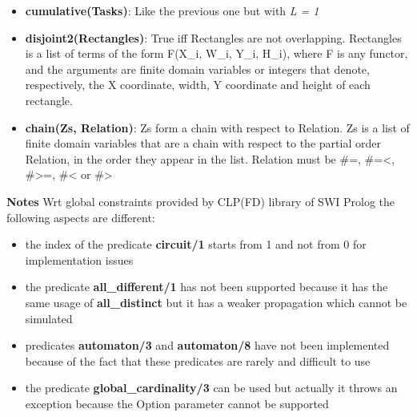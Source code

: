 \begin{itemize}
    \item \textbf{cumulative(Tasks)}: Like the previous one but with \textit{L = 1}
    \item \textbf{disjoint2(Rectangles)}: True iff Rectangles are not overlapping. Rectangles is a list of terms of the form F(X\_i, W\_i, Y\_i, H\_i), where F is any functor, and the arguments are finite domain variables or integers that denote, respectively, the X coordinate, width, Y coordinate and height of each rectangle.
    \item \textbf{chain(Zs, Relation)}: Zs form a chain with respect to Relation. Zs is a list of finite domain variables that are a chain with respect to the partial order Relation, in the order they appear in the list. Relation must be \#=, \#=<, \#>=, \#< or \#>
\end{itemize}
\textbf{Notes}\newline\newline
Wrt global constraints provided by CLP(FD) library of SWI Prolog the following aspects are different:
\begin{itemize}
    \item the index of the predicate \textbf{circuit/1} starts from 1 and not from 0 for implementation issues
    \item the predicate \textbf{all\_different/1} has not been supported because it has the same usage of \textbf{all\_distinct} but it has a weaker propagation which cannot be simulated
    \item predicates \textbf{automaton/3} and \textbf{automaton/8} have not been implemented because of the fact that these predicates are rarely and difficult to use
    \item the predicate \textbf{global\_cardinality/3} can be used but actually it throws an exception because the Option parameter cannot be supported
\end{itemize}

